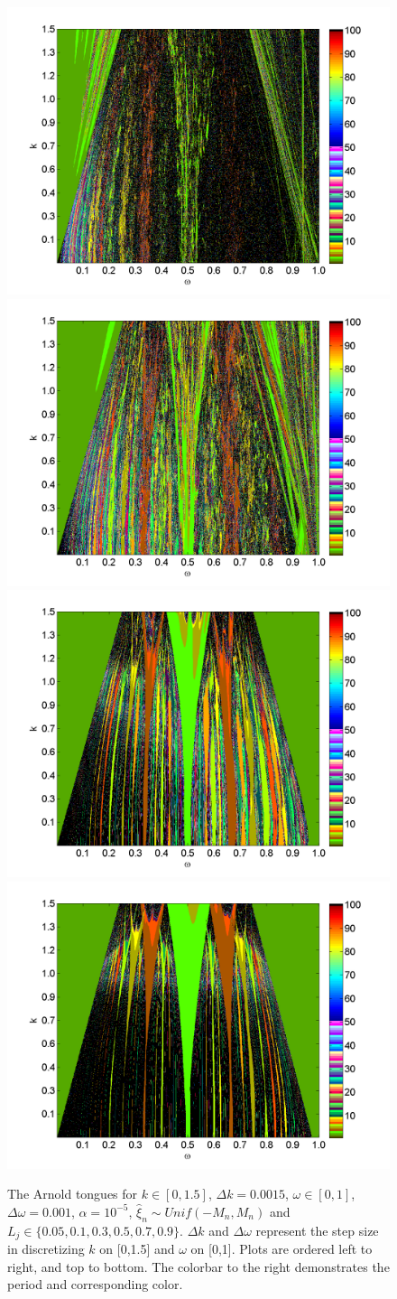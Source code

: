 \begin{figure}[H]\linespread{1}  
\caption[The Arnold tongues for the random circle map, uniform
distribution, $\alpha = 10^{-5}$]{The Arnold
  tongues for $k\in [0,1.5]$, $\Delta k = 0.0015$, $\omega \in [0,1]$,
  $\Delta \omega = 0.001$, $\alpha = 10^{-5}$, $\hat{\xi}_n\sim Unif(-M_n,M_n)$ and $L_j \in
  \{0.05,0.1,0.3,0.5,0.7,0.9\}$. $\Delta k$ and $\Delta \omega$
  represent the step size in discretizing $k$ on [0,1.5] and $\omega$
  on [0,1]. Plots are ordered left to right,
  and top to bottom. The colorbar to the right demonstrates the period and corresponding color.}\label{fig:rcirctongues_u}
\centering
\includegraphics[width=.5\textwidth]{figs/tongues_1000_L_005.png}\hfill
\includegraphics[width=.5\textwidth]{figs/tongues_1000_L_01.png}\\
\includegraphics[width=.5\textwidth]{figs/tongues_1000_L_03.png}\hfill
\includegraphics[width=.5\textwidth]{figs/tongues_1000_L_05.png}\\

\end{figure}
